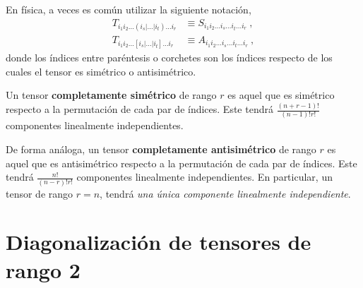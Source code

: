 \begin{itemize}
    En física, a veces es común utilizar la siguiente notación,
    \begin{align}
        T_{i_1 i_2 \dots (i_s| \dots |i_t) \dots i_r} & \equiv S_{i_1 i_2 \dots i_s \dots i_t \dots i_r} \ , \\
        T_{i_1 i_2 \dots [i_s| \dots |i_t] \dots i_r} & \equiv A_{i_1 i_2 \dots i_s \dots i_t \dots i_r} \ ,
    \end{align}
    donde los índices entre paréntesis o corchetes son los índices respecto de los cuales el tensor es simétrico o antisimétrico.

    Un tensor \textbf{completamente simétrico} de rango $r$ es aquel que es simétrico respecto a la permutación de cada par de índices. Este tendrá $\frac{(n+r-1)!}{(n-1)! r!}$ componentes linealmente independientes.

    De forma análoga, un tensor \textbf{completamente antisimétrico} de rango $r$ es aquel que es antisimétrico respecto a la permutación de cada par de índices. Este tendrá $\frac{n!}{(n-r)! r!}$ componentes linealmente independientes. En particular, un tensor de rango $r=n$, tendrá \emph{una única componente linealmente independiente}.
\end{itemize}


\section{Diagonalización de tensores de rango 2}

